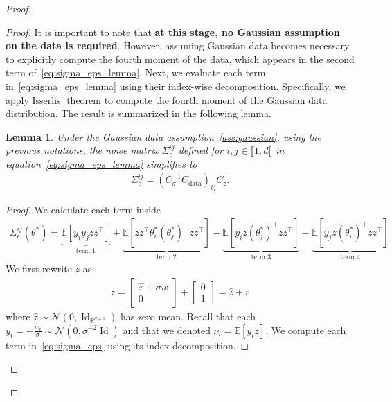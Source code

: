 \documentclass[11pt]{article}
\newtheorem{lem}{Lemma}
\newcommand{\id}{\operatorname{Id}}
\newcommand{\RR}{\mathbb{R}}
\newcommand{\EE}{\mathbb{E}}
\begin{document}
\begin{proof}
\begin{proof}
 It is important to note that \textbf{at this stage, no Gaussian assumption on the data is required}. However, assuming Gaussian data becomes necessary to explicitly compute the fourth moment of the data, which appears in the second term of~\eqref{eq:sigma_eps_lemma}. Next, we evaluate each term in~\eqref{eq:sigma_eps_lemma} using their index-wise decomposition. Specifically, we apply Isserlis' theorem to compute the fourth moment of the Gaussian data distribution. The result is summarized in the following lemma. 
\begin{lem} \label{lem:SGD_2} Under the Gaussian data assumption~\ref{ass:gaussian}, using the previous notations, the noise matrix $\Sigma_\epsilon^{ij}$ defined for $i,j \in \llbracket 1, d \rrbracket$ in equation~\eqref{eq:sigma_eps_lemma} simplifies to
\begin{align*}
\Sigma^{ij}_\epsilon = (C_\sigma^{-1}C_\mathrm{data})_{ij} C_z.
 \end{align*}
\end{lem}
\begin{proof}
We calculate each term inside 
\begin{align} \label{eq:sigma_eps}
   \Sigma_\epsilon^{ij}(\theta^*) = \underbrace{\EE[y_i y_j z z^\top]}_{\text{term } 1} + \underbrace{\EE[z z^\top \theta_i^*(\theta_j^*)^\top z z^\top]}_{\text{term } 2} - \underbrace{\EE[y_i z (\theta_j^*)^\top z z^\top]}_{\text{term } 3} - \underbrace{\EE[y_j z (\theta_i^*)^\top z z^\top]}_{\text{term } 4}
\end{align}
We first rewrite $z$ as 
\begin{align*}
z = 
\begin{bmatrix}
\hat x + \sigma  w\\
0
\end{bmatrix}
 + 
\begin{bmatrix}
0 \\
1
\end{bmatrix}
 = 
\hat{z}
 + 
r
\end{align*}
where $\hat z \sim \mathcal{N}(0, \id_{\RR^{d+1}})$ has zero mean. Recall that each $y_i = -\frac{w_i}{\sigma} \sim \mathcal{N}(0, \sigma^{-2}\id)$ and that we denoted $\nu_i = \EE[y_i z]$. We compute each term in~\eqref{eq:sigma_eps} using its index decomposition. 

\end{proof}
\end{proof}
\end{proof}
\end{document}
